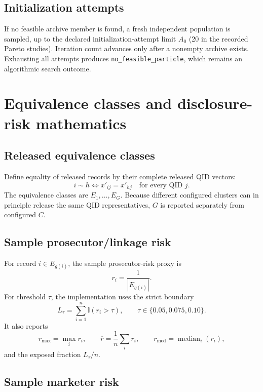 \documentclass[11pt,a4paper]{article}
\newcommand{\I}{\mathbb{I}}
\newcommand{\card}[1]{\left\lvert #1\right\rvert}
\newcommand{\code}[1]{\texttt{#1}}
\DeclareMathOperator{\median}{median}
\begin{document}
\subsection{Initialization attempts}

If no feasible archive member is found, a fresh independent population is
sampled, up to the declared initialization-attempt limit $A_0$ (20 in the
recorded Pareto studies).  Iteration count advances only after a nonempty
archive exists.  Exhausting all attempts produces
\code{no\_feasible\_particle}, which remains an algorithmic search outcome.

\section{Equivalence classes and disclosure-risk mathematics}

\subsection{Released equivalence classes}

Define equality of released records by their complete released QID vectors:
\begin{equation}
i\sim h\iff x'_{ij}=x'_{hj}\quad\text{for every QID }j.
\tag{52}
\end{equation}
The equivalence classes are $E_1,\ldots,E_G$.  Because different configured
clusters can in principle release the same QID representatives, $G$ is
reported separately from configured $C$.

\subsection{Sample prosecutor/linkage risk}

For record $i\in E_{g(i)}$, the sample prosecutor-risk proxy is
\begin{equation}
r_i=\frac{1}{\card{E_{g(i)}}}.
\tag{53}
\end{equation}
For threshold $\tau$, the implementation uses the strict boundary
\begin{equation}
L_\tau=\sum_{i=1}^{n}\I(r_i>\tau),
\qquad \tau\in\{0.05,0.075,0.10\}.
\tag{54}
\end{equation}
It also reports
\[
r_{\max}=\max_i r_i,\qquad
\overline r=\frac1n\sum_i r_i,
\qquad
r_{\mathrm{med}}=\median_i(r_i),
\tag{55}
\]
and the exposed fraction $L_\tau/n$.

\subsection{Sample marketer risk}
\end{document}
